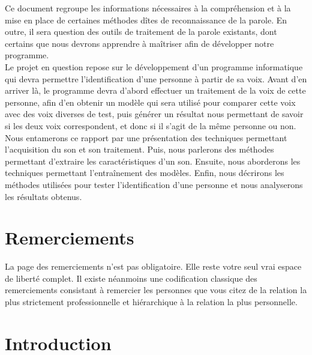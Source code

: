 \documentclass[a4paper, 12pt]{book}
\newcommand{\listofprograms}{\listof{programslist}{Liste des codes source}}
\newcounter{program}[subsection]
\begin{document}
Ce document regroupe les informations nécessaires à la compréhension et à la mise en place de certaines méthodes dîtes de reconnaissance de la parole. En outre, il sera question des outils de traitement de la parole existants, dont certains que nous devrons apprendre à maîtriser afin de développer notre programme.\\

Le projet en question repose sur le développement d'un programme informatique qui devra permettre l'identification d'une personne à partir de sa voix. Avant d'en arriver là, le programme devra d'abord effectuer un traitement de la voix de cette personne, afin d'en obtenir un modèle qui sera utilisé pour comparer cette voix avec des voix diverses de test, puis générer un résultat nous permettant de savoir si les deux voix correspondent, et donc si il s'agit de la même personne ou non.\\

Nous entamerons ce rapport par une présentation des techniques permettant l'acquisition du son et son traitement. Puis, nous parlerons des méthodes permettant d'extraire les caractéristiques d'un son. Ensuite, nous aborderons les techniques permettant l'entraînement des modèles. Enfin, nous décrirons les méthodes utilisées pour tester l'identification d'une personne et nous analyserons les résultats obtenus. 

\chapter*{Remerciements}
 La page des
remerciements n'est pas obligatoire. Elle reste votre seul vrai espace
de liberté complet. Il existe néanmoins une codification classique des
remerciements consistant à remercier les personnes que vous citez de
la relation la plus strictement professionnelle et hiérarchique à la
relation la plus personnelle.
\tableofcontents
\listoffigures
\listofprograms
\mainmatter
\chapter*{Introduction}
\end{document}
